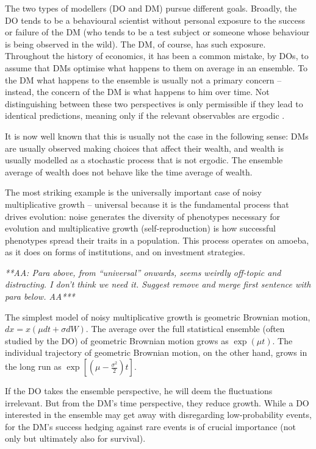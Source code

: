 \documentclass[a4paper, 12pt]{article}
\renewcommand{\AA}[1]{{\it ***AA: #1 AA***}}
\begin{document}
The two types of modellers (DO and DM) pursue different goals. Broadly, the DO tends to be a behavioural scientist without personal exposure to the success or failure of the DM (who tends to be a test subject or someone whose behaviour is being observed in the wild). The DM, of course, has such exposure. Throughout the history of economics, it has been a common mistake, by DOs, to assume that DMs optimise what happens to them on average in an ensemble. To the DM what happens to the ensemble is usually not a primary concern -- instead, the concern of the DM is what happens to him over time. Not distinguishing between these two perspectives is only permissible if they lead to identical predictions, meaning only if the relevant observables are ergodic \citep{Peters2019b}. 

It is now well known that this is usually not the case in the following sense: DMs are usually observed making choices that affect their wealth, and wealth is usually modelled as a stochastic process that is not ergodic. The ensemble average of wealth does not behave like the time average of wealth.

The most striking example is the universally important case of noisy multiplicative growth -- universal because it is the fundamental process that drives evolution: noise generates the diversity of phenotypes necessary for evolution and multiplicative growth (self-reproduction) is how successful phenotypes spread their traits in a population. This process operates on amoeba, as it does on forms of institutions, and on investment strategies.

\AA{Para above, from ``universal'' onwards, seems weirdly off-topic and distracting. I don't think we need it. Suggest remove and merge first sentence with para below.}

The simplest model of noisy multiplicative growth is geometric Brownian motion, $dx=x(\mu dt+\sigma dW)$. The average over the full statistical ensemble (often studied by the DO) of geometric Brownian motion grows as $\exp(\mu t)$. The individual trajectory of geometric Brownian motion, on the other hand, grows in the long run as $\exp[(\mu-\frac{\sigma^2}{2})t]$.

If the DO takes the ensemble perspective, he will deem the fluctuations irrelevant. But from the DM's time perspective, they reduce growth. While a DO interested in the ensemble may get away with disregarding low-probability events, for the DM's success hedging against rare events is of crucial importance (not only but ultimately also for survival).
\end{document}
